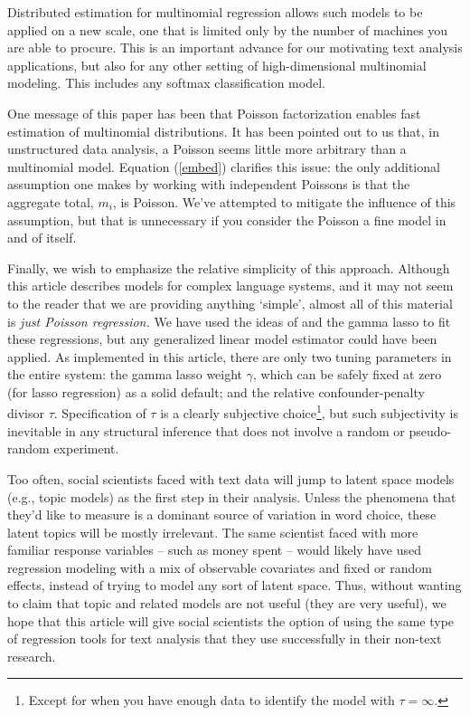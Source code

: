 \documentclass[12pt]{article}
\begin{document}
Distributed estimation for multinomial regression allows such models to be
applied on a new  scale, one that is limited only by the number of machines
you are able to procure. This is an important advance for our motivating text
analysis applications, but also for any other setting of high-dimensional
multinomial modeling.  This includes any softmax classification model.

One message of this paper has been that Poisson factorization enables fast
estimation of multinomial distributions.  It has been pointed out to us that,
in unstructured data analysis, a Poisson seems little more arbitrary than a
multinomial model.  Equation (\ref{embed}) clarifies this issue:  the only
additional assumption one makes by working with independent Poissons is that
the aggregate total, $m_i$, is Poisson.  We've attempted to mitigate the
influence of this assumption, but that is unnecessary if you consider the
Poisson a fine model in and of itself.

Finally, we wish to emphasize the relative simplicity of this approach.
Although this article describes models for complex language systems, and it
may not seem to the reader that we are providing anything `simple', almost all
of this material is {\it just Poisson regression.}   We have used the ideas of
\cite{taddy_gamma_2013} and the gamma lasso to fit these regressions, but any
generalized linear model estimator could have been applied.  As implemented in
this article, there are only two tuning parameters in the entire system:  the
gamma lasso weight $\gamma$, which can be safely fixed at zero (for lasso
regression) as a solid default; and the relative confounder-penalty divisor
$\tau$.  Specification of $\tau$ is a clearly subjective choice\footnote{Except for when you have enough data to identify the model with $\tau = \infty$.},
but such subjectivity  is inevitable in any structural inference that does not
involve a random or pseudo-random experiment.

Too often, social scientists faced with text data will jump to latent space
models (e.g., topic models) as the first step in their analysis.  Unless the
phenomena that they'd like to measure is a dominant source of variation in
word choice, these latent topics will be mostly irrelevant.  The same
scientist faced with more familiar response variables -- such as money spent
-- would likely have used regression modeling with a mix
of observable covariates and fixed or random effects, instead of trying to
model any sort of latent space.  Thus, without wanting to claim that topic and
related models are not useful (they are very useful), we hope that this
article will give social scientists the option of using the same type of
regression tools for text analysis that they use successfully in their
non-text research.
\end{document}
